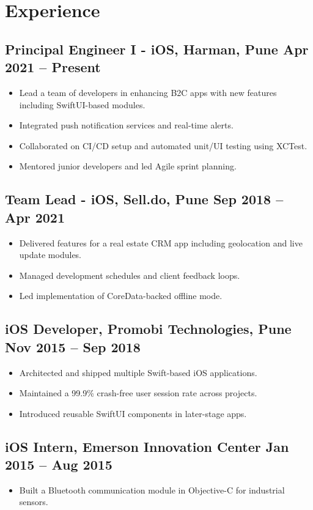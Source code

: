 \documentclass[a4paper,10pt]{article}
\begin{document}
\section*{Experience}
\subsection*{Principal Engineer I - iOS, Harman, Pune \hfill Apr 2021 -- Present}
\begin{itemize}[noitemsep,topsep=0pt]
    \item Lead a team of developers in enhancing B2C apps with new features including SwiftUI-based modules.
    \item Integrated push notification services and real-time alerts.
    \item Collaborated on CI/CD setup and automated unit/UI testing using XCTest.
    \item Mentored junior developers and led Agile sprint planning.
\end{itemize}

\subsection*{Team Lead - iOS, Sell.do, Pune \hfill Sep 2018 -- Apr 2021}
\begin{itemize}[noitemsep,topsep=0pt]
    \item Delivered features for a real estate CRM app including geolocation and live update modules.
    \item Managed development schedules and client feedback loops.
    \item Led implementation of CoreData-backed offline mode.
\end{itemize}

\subsection*{iOS Developer, Promobi Technologies, Pune \hfill Nov 2015 -- Sep 2018}
\begin{itemize}[noitemsep,topsep=0pt]
    \item Architected and shipped multiple Swift-based iOS applications.
    \item Maintained a 99.9\% crash-free user session rate across projects.
    \item Introduced reusable SwiftUI components in later-stage apps.
\end{itemize}

\subsection*{iOS Intern, Emerson Innovation Center \hfill Jan 2015 -- Aug 2015}
\begin{itemize}[noitemsep,topsep=0pt]
    \item Built a Bluetooth communication module in Objective-C for industrial sensors.
\end{itemize}
\end{document}
